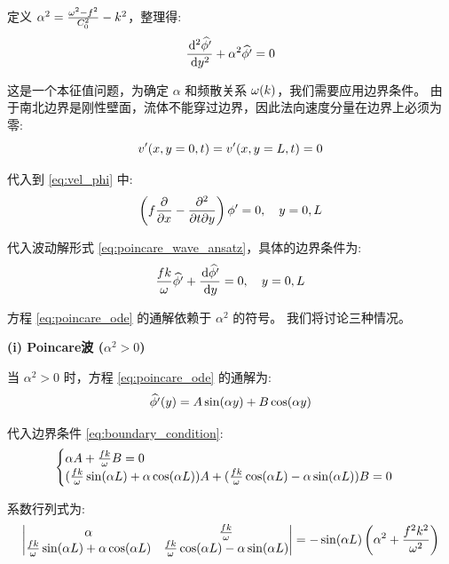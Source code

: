 定义 $\alpha^2 = \frac{\omega^2 - f^2}{C_0^2} - k^2$，整理得:
\begin{equation}
    \ode[2]{\complexamp{\gravpotential^\prime}}{y} + \alpha^2 \complexamp{\gravpotential^\prime} = 0
    \label{eq:poincare_ode}
\end{equation}

这是一个本征值问题，为确定 $\alpha$ 和频散关系 $\omega(k)$，我们需要应用边界条件。
由于南北边界是刚性壁面，流体不能穿过边界，因此法向速度分量在边界上必须为零:
\begin{equation}
    v^\prime(x, y = 0, t) = v^\prime(x, y = L, t) = 0
    \label{eq:rigid_boundary}
\end{equation}

代入到 \eqref{eq:vel_phi} 中:
\begin{equation*}
    \left(\coriolis \pde{}{x} - \mpde{}{t}{y}\right) \gravpotential^\prime = 0, \quad y = 0, L
\end{equation*}

代入波动解形式 \eqref{eq:poincare_wave_ansatz}，具体的边界条件为:
\begin{equation}
    \frac{\coriolis k}{\frequency} \complexamp{\gravpotential^\prime} + \ode{\complexamp{\gravpotential^\prime}}{y} = 0, \quad y = 0, L
    \label{eq:boundary_condition}
\end{equation}

方程 \eqref{eq:poincare_ode} 的通解依赖于 $\alpha^2$ 的符号。
我们将讨论三种情况。

\textbf{(i) Poincare波 ($\alpha^2 > 0$)}

当 $\alpha^2 > 0$ 时，方程 \eqref{eq:poincare_ode} 的通解为:
\begin{equation}
    \widehat{\phi^\prime}(y) = A \sin(\alpha y) + B \cos(\alpha y)
    \label{eq:poincare_general_solution}
\end{equation}

代入边界条件 \eqref{eq:boundary_condition}:
\begin{equation*}
    \begin{cases}
        \alpha A + \frac{f k}{\omega} B = 0 \\
        (\frac{f k}{\omega} \sin(\alpha L) + \alpha \cos(\alpha L)) A + (\frac{f k}{\omega} \cos(\alpha L) - \alpha \sin(\alpha L)) B = 0
    \end{cases}
\end{equation*}

系数行列式为:
\begin{equation*}
    \begin{vmatrix}
        \alpha & \frac{f k}{\omega} \\
        \frac{f k}{\omega} \sin(\alpha L) + \alpha \cos(\alpha L) & \frac{f k}{\omega} \cos(\alpha L) - \alpha \sin(\alpha L)
    \end{vmatrix}
    = -\sin(\alpha L) \left(\alpha^2 + \frac{f^2 k^2}{\omega^2}\right)
\end{equation*}


